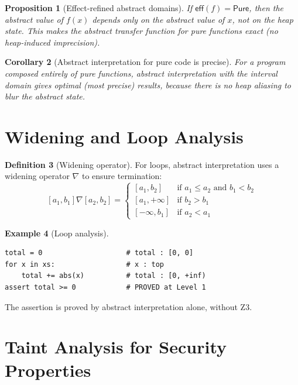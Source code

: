\documentclass[11pt,a4paper]{report}
\theoremstyle{definition}
\newtheorem{definition}{Definition}[chapter]
\newtheorem{example}[definition]{Example}
\theoremstyle{plain}
\newtheorem{proposition}[definition]{Proposition}
\newtheorem{corollary}[definition]{Corollary}
\newcommand{\Pure}{\mathsf{Pure}}
\begin{document}
\begin{proposition}[Effect-refined abstract domains]
If $\mathsf{eff}(f) = \Pure$, then the abstract value of $f(x)$ depends only on
the abstract value of $x$, not on the heap state.  This makes the abstract
transfer function for pure functions \emph{exact} (no heap-induced imprecision).
\end{proposition}

\begin{corollary}[Abstract interpretation for pure code is precise]
For a program composed entirely of pure functions, abstract interpretation
with the interval domain gives \emph{optimal} (most precise) results, because
there is no heap aliasing to blur the abstract state.
\end{corollary}


\section{Widening and Loop Analysis}

\begin{definition}[Widening operator]
For loops, abstract interpretation uses a widening operator $\nabla$ to ensure
termination:
\[
  [a_1, b_1] \nabla [a_2, b_2] = \begin{cases}
    [a_1, b_2] & \text{if } a_1 \leq a_2 \text{ and } b_1 < b_2 \\
    [a_1, +\infty] & \text{if } b_2 > b_1 \\
    [-\infty, b_1] & \text{if } a_2 < a_1
  \end{cases}
\]
\end{definition}

\begin{example}[Loop analysis]
\begin{lstlisting}[style=python]
total = 0                    # total : [0, 0]
for x in xs:                 # x : top
    total += abs(x)          # total : [0, +inf)
assert total >= 0            # PROVED at Level 1
\end{lstlisting}
The assertion is proved by abstract interpretation alone, without Z3.
\end{example}

\section{Taint Analysis for Security Properties}
\end{document}
